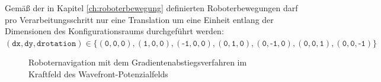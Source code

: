 Gemäß der in Kapitel \ref{ch:roboterbewegung} definierten Roboterbewegungen darf pro Verarbeitungsschritt nur eine Translation um eine Einheit entlang der Dimensionen des Konfigurationsraums  durchgeführt werden: $ (\texttt{dx}, \texttt{dy}, \texttt{drotation}) \in \{(\texttt{0},\texttt{0},\texttt{0}),(\texttt{1},\texttt{0},\texttt{0}),(\texttt{-1},\texttt{0},\texttt{0}),(\texttt{0},\texttt{1},\texttt{0}),(\texttt{0},\texttt{-1},\texttt{0}),(\texttt{0},\texttt{0},\texttt{1}),(\texttt{0},\texttt{0},\texttt{-1})\}$
\vspace*{0.1cm}
\begin{figure}[h!]
	\centering
	\footnotesize
	\centerline{}
	\caption{Roboternavigation mit dem Gradientenabstiegsverfahren im Kraftfeld des Wavefront-Potenzialfelds}
\end{figure}




